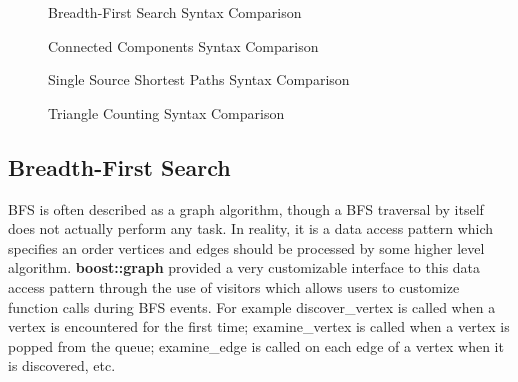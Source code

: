 \begin{figure}[ht]
\noindent\begin{minipage}{.499\textwidth}
{\small
      
}
\end{minipage}\hfill
\begin{minipage}{.499\textwidth}
{\small
      
}
\end{minipage}
\caption{Breadth-First Search Syntax Comparison}
\label{fig:bfssyntax}
\end{figure}
\begin{figure}[ht]
\noindent\begin{minipage}{.499\textwidth}
{\small
      
}
\end{minipage}\hfill
\begin{minipage}{.499\textwidth}
{\small
      
}
\end{minipage}
\caption{Connected Components Syntax Comparison}
\label{fig:ccsyntax}
\end{figure}

\begin{figure}[ht]
\noindent\begin{minipage}{.499\textwidth}
{\small
      
}
\end{minipage}\hfill
\begin{minipage}{.499\textwidth}
{\small
      
}
\end{minipage}
\caption{Single Source Shortest Paths Syntax Comparison}
\label{fig:ssspsyntax}
\end{figure}

\begin{figure}[ht]
\noindent\begin{minipage}{.499\textwidth}
{\small
      
}
\end{minipage}\hfill
\begin{minipage}{.499\textwidth}
{\small
      
}
\end{minipage}
\caption{Triangle Counting Syntax Comparison}
\label{fig:tcsyntax}
\end{figure}

\subsection{Breadth-First Search}
BFS is often described as a graph algorithm, though a BFS traversal
by itself does not actually perform any task.
In reality, it is a data access pattern which specifies an order
vertices and edges should be processed by some higher level algorithm.
\textbf{boost::graph} provided a very customizable interface to this
data access pattern through the use of visitors which allows users
to customize function calls during BFS events.
For example discover\_vertex is called when a vertex is encountered for the
first time; examine\_vertex is called when a vertex is popped from the queue;
examine\_edge is called on each edge of a vertex when it is discovered, etc.

